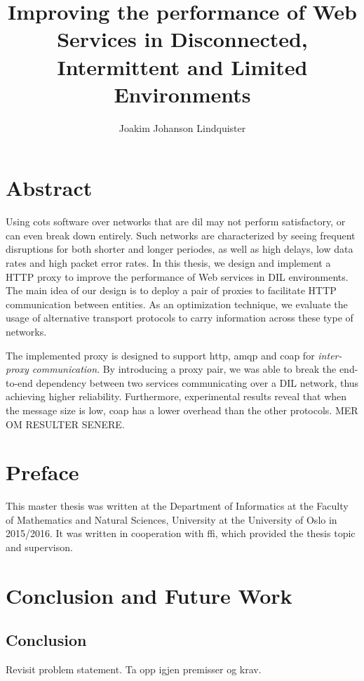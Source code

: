 \documentclass[USenglish]{ifimaster}
\title{Improving the performance of Web Services in Disconnected, Intermittent
and Limited Environments}
\author{Joakim Johanson Lindquister}
\begin{document}
\ififorside{}

\chapter*{Abstract}

Using \gls{cots} software over networks that are \gls{dil} may not perform
satisfactory, or can even break down entirely. Such networks are characterized
by seeing frequent disruptions for both shorter and longer periodes, as well as
high delays, low data rates and high packet error rates. In this thesis, we
design and implement a HTTP proxy to improve the performance of Web services in
DIL environments. The main idea of our design is to deploy a pair of proxies to
facilitate HTTP communication between entities. As an optimization technique, we
evaluate the usage of alternative transport protocols to carry information
across these type of networks.

The implemented proxy is designed to support \gls{http}, \gls{amqp} and
\gls{coap} for \textit{inter-proxy communication}. By introducing a proxy pair,
we was able to break the end-to-end dependency between two services
communicating over a DIL network, thus achieving higher reliability.
Furthermore, experimental results reveal that when the message size is low,
\gls{coap} has a lower overhead than the other protocols. MER OM RESULTER
SENERE.



\chapter*{Preface}

This master thesis was written at the Department of Informatics at the Faculty
of Mathematics and Natural Sciences, University at the University of Oslo in
2015/2016. It was written in cooperation with \gls{ffi}, which provided the
thesis topic and supervison.


\tableofcontents

\glsresetall








\chapter{Conclusion and Future Work}
\label{chapter:conclusion}

\section{Conclusion}
Revisit problem statement. Ta opp igjen premisser og krav.
\end{document}
